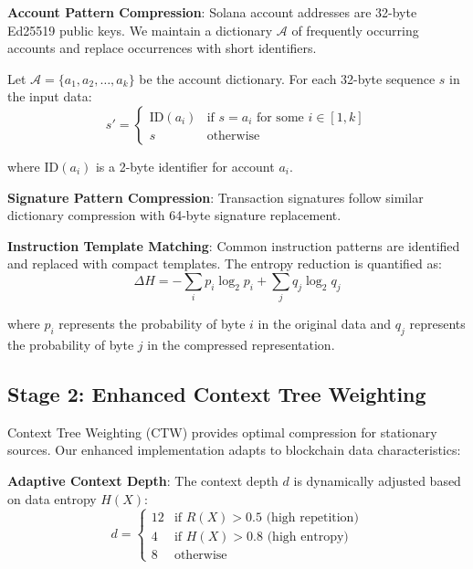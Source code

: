 \documentclass[11pt,a4paper]{article}
\begin{document}
\textbf{Account Pattern Compression}: Solana account addresses are 32-byte Ed25519 public keys. We maintain a dictionary $\mathcal{A}$ of frequently occurring accounts and replace occurrences with short identifiers.

Let $\mathcal{A} = \{a_1, a_2, \ldots, a_k\}$ be the account dictionary. For each 32-byte sequence $s$ in the input data:
\begin{equation}
s' = \begin{cases}
\text{ID}(a_i) & \text{if } s = a_i \text{ for some } i \in [1,k] \\
s & \text{otherwise}
\end{cases}
\end{equation}

where $\text{ID}(a_i)$ is a 2-byte identifier for account $a_i$.

\textbf{Signature Pattern Compression}: Transaction signatures follow similar dictionary compression with 64-byte signature replacement.

\textbf{Instruction Template Matching}: Common instruction patterns are identified and replaced with compact templates. The entropy reduction is quantified as:
\begin{equation}
\Delta H = -\sum_{i} p_i \log_2 p_i + \sum_{j} q_j \log_2 q_j
\end{equation}

where $p_i$ represents the probability of byte $i$ in the original data and $q_j$ represents the probability of byte $j$ in the compressed representation.

\subsection{Stage 2: Enhanced Context Tree Weighting}

Context Tree Weighting (CTW) provides optimal compression for stationary sources. Our enhanced implementation adapts to blockchain data characteristics:

\textbf{Adaptive Context Depth}: The context depth $d$ is dynamically adjusted based on data entropy $H(X)$:
\begin{equation}
d = \begin{cases}
12 & \text{if } R(X) > 0.5 \text{ (high repetition)} \\
4 & \text{if } H(X) > 0.8 \text{ (high entropy)} \\
8 & \text{otherwise}
\end{cases}
\end{equation}
\end{document}
